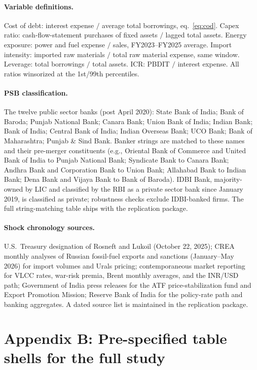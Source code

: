 \documentclass[12pt]{article}
\begin{document}
\paragraph{Variable definitions.} Cost of debt: interest expense $/$ average total
borrowings, eq.~\eqref{eq:cod}. Capex ratio: cash-flow-statement purchases of fixed assets
$/$ lagged total assets. Energy exposure: power and fuel expense $/$ sales, FY2023--FY2025
average. Import intensity: imported raw materials $/$ total raw material expense, same
window. Leverage: total borrowings $/$ total assets. ICR: PBDIT $/$ interest expense.
All ratios winsorized at the 1st/99th percentiles.

\paragraph{PSB classification.} The twelve public sector banks (post April 2020):
State Bank of India; Bank of Baroda; Punjab National Bank; Canara Bank; Union Bank of
India; Indian Bank; Bank of India; Central Bank of India; Indian Overseas Bank; UCO Bank;
Bank of Maharashtra; Punjab \& Sind Bank. Banker strings are matched to these names and
their pre-merger constituents (e.g., Oriental Bank of Commerce and United Bank of India to
Punjab National Bank; Syndicate Bank to Canara Bank; Andhra Bank and Corporation Bank to
Union Bank; Allahabad Bank to Indian Bank; Dena Bank and Vijaya Bank to Bank of Baroda).
IDBI Bank, majority-owned by LIC and classified by the RBI as a private sector bank since
January 2019, is classified as private; robustness checks exclude IDBI-banked firms.
The full string-matching table ships with the replication package.

\paragraph{Shock chronology sources.} U.S.\ Treasury designation of Rosneft and Lukoil
(October 22, 2025); CREA monthly analyses of Russian fossil-fuel exports and sanctions
(January--May 2026) for import volumes and Urals pricing; contemporaneous market reporting
for VLCC rates, war-risk premia, Brent monthly averages, and the INR/USD path; Government
of India press releases for the ATF price-stabilization fund and Export Promotion Mission;
Reserve Bank of India for the policy-rate path and banking aggregates. A dated source list
is maintained in the replication package.

\newpage
\section*{Appendix B: Pre-specified table shells for the full study}
\setcounter{table}{0}
\renewcommand{\thetable}{B\arabic{table}}
\end{document}
